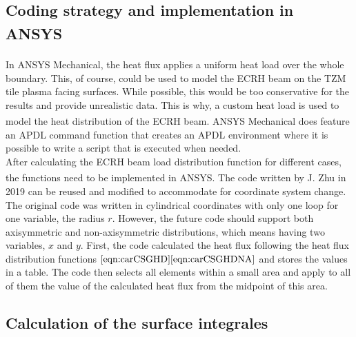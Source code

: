 
\subsection{Coding strategy and implementation in ANSYS\textsuperscript{\textregistered} }
\normalsize{In ANSYS\textsuperscript{\textregistered} Mechanical, the heat flux applies a uniform heat load over the whole boundary. This, of course, could be used to model the \acrshort{ECRH} beam on the TZM tile plasma facing surfaces. While possible, this would be too conservative for the results and provide unrealistic data. This is why, a custom heat load is used to model the heat distribution of the \acrshort{ECRH} beam. ANSYS\textsuperscript{\textregistered} Mechanical does feature an APDL command function that creates an APDL environment where it is possible to write a script that is executed when needed.}
\\
\break
\normalsize{\indent After calculating the \acrshort{ECRH} beam load distribution function for different cases, the functions need to be implemented in ANSYS\textsuperscript{\textregistered}. The code written by J. Zhu \cites{zhu_parametric_2019} in 2019 can be reused and modified to accommodate for coordinate system change. The original code was written in cylindrical coordinates with only one loop for one variable, the radius $r$. However, the future code should support both axisymmetric and non-axisymmetric distributions, which means having two variables, $x$ and $y$. First, the code calculated the heat flux following the heat flux distribution functions $\eqref{eqn:carCSGHD} \eqref{eqn:carCSGHDNA}$ and stores the values in a table. The code then selects all elements within a small area and apply to all of them the value of the calculated heat flux from the midpoint of this area.}



\subsection{Calculation of the surface integrales}
\normalsize{}